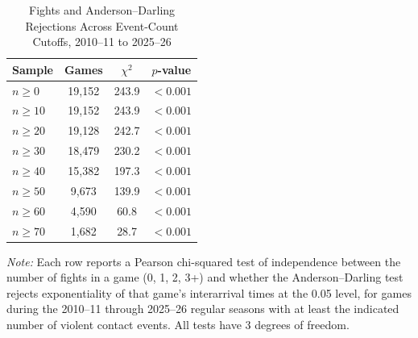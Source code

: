 \begin{table}[htbp]
\centering
\caption{Fights and Anderson--Darling Rejections Across Event-Count Cutoffs, 2010--11 to 2025--26}
\label{tab:fight_vs_AD_rejection_chi_squared_20102011_20252026}
\small
\renewcommand{\arraystretch}{1.12}
\setlength{\tabcolsep}{6pt}

\begin{tabular*}{0.85\textwidth}{@{\extracolsep{\fill}}lccc}
\toprule
Sample & Games & $\chi^2$ & $p$-value \\
\midrule
$n \geq 0$ & 19,152 & 243.9 & $<0.001$ \\
$n \geq 10$ & 19,152 & 243.9 & $<0.001$ \\
$n \geq 20$ & 19,128 & 242.7 & $<0.001$ \\
$n \geq 30$ & 18,479 & 230.2 & $<0.001$ \\
$n \geq 40$ & 15,382 & 197.3 & $<0.001$ \\
$n \geq 50$ & 9,673 & 139.9 & $<0.001$ \\
$n \geq 60$ & 4,590 & 60.8 & $<0.001$ \\
$n \geq 70$ & 1,682 & 28.7 & $<0.001$ \\
\bottomrule
\end{tabular*}

\vspace{0.4em}
\parbox{0.85\textwidth}{
\footnotesize
\textit{Note:} Each row reports a Pearson chi-squared test of independence between the number of fights in a game (0, 1, 2, 3+) and whether the Anderson--Darling test rejects exponentiality of that game's interarrival times at the 0.05 level, for games during the 2010--11 through 2025--26 regular seasons with at least the indicated number of violent contact events. All tests have 3 degrees of freedom. 
}
\end{table}
